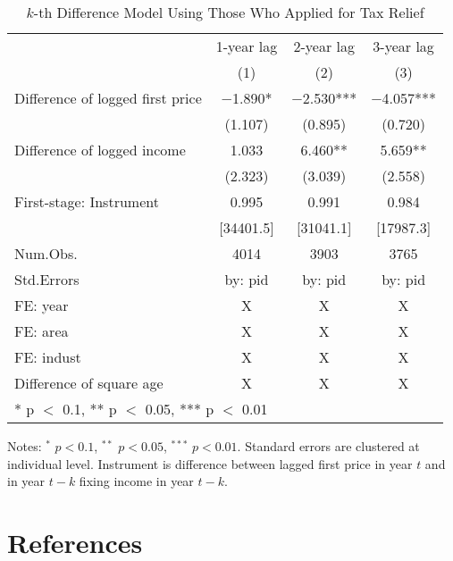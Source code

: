 \documentclass[
  11pt,
  a4paper,
]{article}
\begin{document}
\begin{table}

\caption{\label{tab:KdiffElasticity}$k$-th Difference Model Using Those Who Applied for Tax Relief}
\centering
\fontsize{8}{10}\selectfont
\begin{threeparttable}
\begin{tabular}[t]{lccc}
\toprule
\multicolumn{1}{c}{ } & \multicolumn{1}{c}{1-year lag} & \multicolumn{1}{c}{2-year lag} & \multicolumn{1}{c}{3-year lag} \\
\cmidrule(l{3pt}r{3pt}){2-2} \cmidrule(l{3pt}r{3pt}){3-3} \cmidrule(l{3pt}r{3pt}){4-4}
  & (1) & (2) & (3)\\
\midrule
Difference of logged first price & \num{-1.890}* & \num{-2.530}*** & \num{-4.057}***\\
 & (\num{1.107}) & (\num{0.895}) & (\num{0.720})\\
Difference of logged income & \num{1.033} & \num{6.460}** & \num{5.659}**\\
 & (\num{2.323}) & (\num{3.039}) & (\num{2.558})\\
\midrule
First-stage: Instrument & 0.995 & 0.991 & 0.984\\
 & [34401.5] & [31041.1] & [17987.3]\\
Num.Obs. & \num{4014} & \num{3903} & \num{3765}\\
Std.Errors & by: pid & by: pid & by: pid\\
FE: year & X & X & X\\
FE: area & X & X & X\\
FE: indust & X & X & X\\
Difference of square age & X & X & X\\
\bottomrule
\multicolumn{4}{l}{\rule{0pt}{1em}* p $<$ 0.1, ** p $<$ 0.05, *** p $<$ 0.01}\\
\end{tabular}
\begin{tablenotes}
\item Notes: $^{*}$ $p < 0.1$, $^{**}$ $p < 0.05$, $^{***}$ $p < 0.01$. Standard errors are clustered at individual level. Instrument is difference between lagged first price in year $t$ and in year $t - k$ fixing income in year $t - k$.
\end{tablenotes}
\end{threeparttable}
\end{table}

\newpage

\hypertarget{references}{%
\section*{References}\label{references}}
\end{document}
